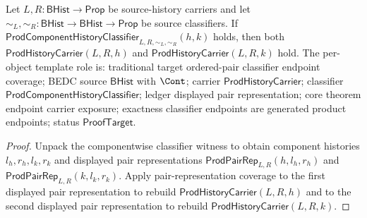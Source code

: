 \begin{theorem}
\label{thm:prod-component-history-classifier-endpoint-carriers}
Let $L,R:\mathsf{BHist}\to\mathsf{Prop}$ be source-history carriers and let
$\sim_L,\sim_R:\mathsf{BHist}\to\mathsf{BHist}\to\mathsf{Prop}$ be source
classifiers. If
$\mathsf{ProdComponentHistoryClassifier}_{L,R,\sim_L,\sim_R}(h,k)$ holds, then
both $\mathsf{ProdHistoryCarrier}(L,R,h)$ and
$\mathsf{ProdHistoryCarrier}(L,R,k)$ hold. The per-object template role is:
traditional target ordered-pair classifier endpoint coverage; BEDC source
$\mathsf{BHist}$ with $\Cont$; carrier $\mathsf{ProdHistoryCarrier}$;
classifier $\mathsf{ProdComponentHistoryClassifier}$; ledger displayed pair
representation; core theorem endpoint carrier exposure; exactness classifier
endpoints are generated product endpoints; status $\mathsf{ProofTarget}$.
\end{theorem}
\begin{proof}
Unpack the componentwise classifier witness to obtain component histories
$l_h,r_h,l_k,r_k$ and displayed pair representations
$\mathsf{ProdPairRep}_{L,R}(h,l_h,r_h)$ and
$\mathsf{ProdPairRep}_{L,R}(k,l_k,r_k)$. Apply pair-representation coverage to
the first displayed pair representation to rebuild
$\mathsf{ProdHistoryCarrier}(L,R,h)$ and to the second displayed pair
representation to rebuild $\mathsf{ProdHistoryCarrier}(L,R,k)$.
\end{proof}

